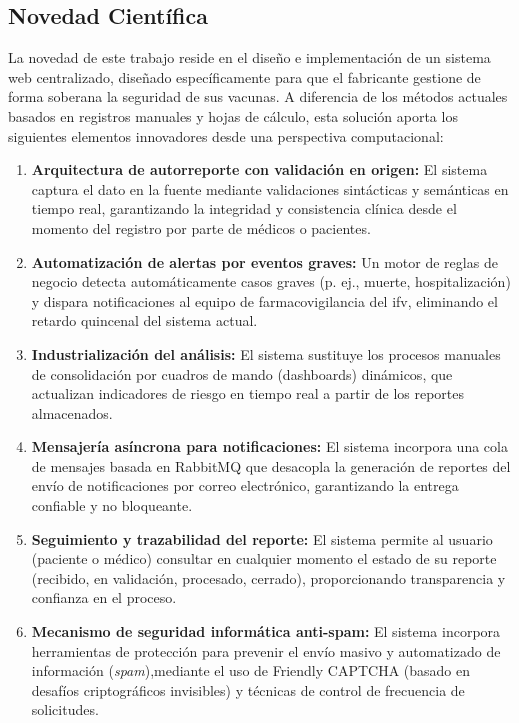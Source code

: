 \subsection{Novedad Científica}

La novedad de este trabajo reside en el diseño e implementación de un sistema web centralizado, diseñado específicamente para que el fabricante gestione de forma soberana la seguridad de sus vacunas. A diferencia de los métodos actuales basados en registros manuales y hojas de cálculo, esta solución aporta los siguientes elementos innovadores desde una perspectiva computacional:

\begin{enumerate}
    \item \textbf{Arquitectura de \gls{autorreporte} con validación en origen:} El sistema captura el dato en la fuente mediante validaciones sintácticas y semánticas en tiempo real, garantizando la integridad y consistencia clínica desde el momento del registro por parte de médicos o pacientes.
    
    \item \textbf{Automatización de alertas por eventos graves:} Un motor de reglas de negocio detecta automáticamente casos graves (p. ej., muerte, hospitalización) y dispara notificaciones al equipo de farmacovigilancia del \gls{ifv}, eliminando el retardo quincenal del sistema actual.
    
    \item \textbf{Industrialización del análisis:} El sistema sustituye los procesos manuales de consolidación por cuadros de mando (dashboards) dinámicos, que actualizan indicadores de riesgo en tiempo real a partir de los reportes almacenados.
    
    \item \textbf{Mensajería asíncrona para notificaciones:} El sistema incorpora una cola de mensajes basada en RabbitMQ que desacopla la generación de reportes del envío de notificaciones por correo electrónico, garantizando la entrega confiable y no bloqueante.
    
    \item \textbf{Seguimiento y trazabilidad del reporte:} El sistema permite al usuario (paciente o médico) consultar en cualquier momento el estado de su reporte (recibido, en validación, procesado, cerrado), proporcionando transparencia y confianza en el proceso.
    
    \item \textbf{Mecanismo de seguridad informática anti-spam:} El sistema incorpora herramientas de protección para prevenir el envío masivo y automatizado de información (\textit{\gls{spam}}),mediante el uso de Friendly CAPTCHA (basado en desafíos criptográficos invisibles) y técnicas de control de frecuencia de solicitudes.
    
\end{enumerate}

